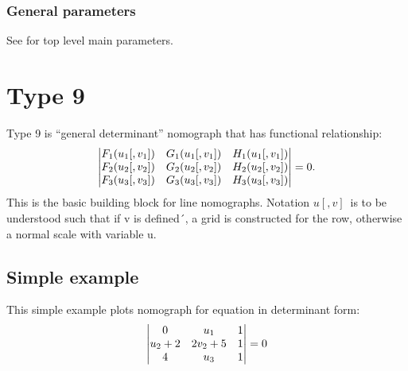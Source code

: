 \documentclass[a4paper,11pt,english]{sphinxmanual}
\begin{document}
\subsubsection{General parameters}
\label{types/types:id41}
See {\hyperref[main_params:main-params]{\emph{}}} for top level main parameters.


\section{Type 9}
\label{types/types:type9-ref}\label{types/types:type-9}
Type 9 is ``general determinant'' nomograph that has functional
relationship:
\begin{gather}
\begin{split}\begin{vmatrix}
F_1(u_1[,v_1])      & G_1(u_1[,v_1]) & H_1(u_1[,v_1])      \\
F_2(u_2[,v_2])      & G_2(u_2[,v_2]) & H_2(u_2[,v_2]) \\
F_3(u_3[,v_3])      & G_3(u_3[,v_3]) & H_3(u_3[,v_3])
\end{vmatrix} = 0.\end{split}\notag
\end{gather}
This is the basic building block for line nomographs. Notation
\(u[,v]\,\) is to be understood such that if v is defined´, a grid
is constructed for the row, otherwise a normal scale with variable u.


\subsection{Simple example}
\label{types/types:id42}
This simple example plots nomograph for equation in determinant form:
\begin{gather}
\begin{split}\begin{vmatrix}
0      & u_1 & 1      \\
u_2+2      & 2v_2+5 & 1 \\
4      & u_3 & 1 \end{vmatrix} = 0\end{split}\notag
\end{gather}
\end{document}
